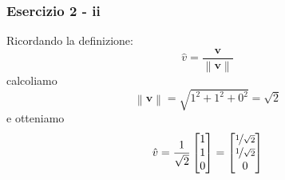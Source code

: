 \documentclass{beamer}
\newcommand{\norm}[1]{\left\lVert#1\right\rVert}
\begin{document}
\begin{frame}
\frametitle{ Esercizio 2 - ii}
Ricordando la definizione:
    \begin{equation*}
    \hat{v} = \frac{\mathbf{v}}{\norm{\mathbf{v}}}
    \end{equation*}
calcoliamo
    \begin{equation*}
    \norm{\mathbf{v}} = \sqrt{1^2 + 1^2 + 0^2} = \sqrt{2}
    \end{equation*}
e otteniamo
\begin{displaymath}
\hat{v} =
    \frac{1}{\sqrt{2}}
    \begin{bmatrix}
    1 \\
    1 \\
    0
                \end{bmatrix}
=  \begin{bmatrix}
    \nicefrac{1}{\sqrt{2}}\\
    \nicefrac{1}{\sqrt{2}}\\
                0
                \end{bmatrix}
\end{displaymath}
\end{frame}
\end{document}
